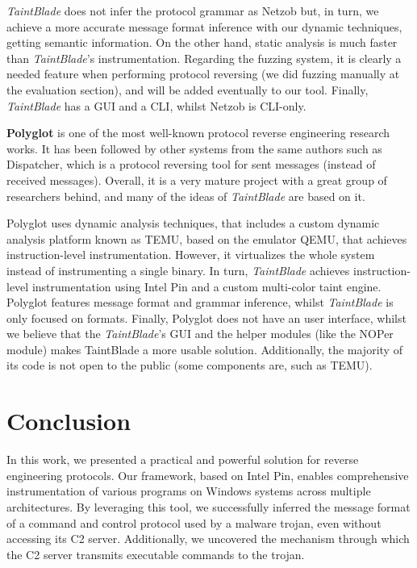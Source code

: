\documentclass[conference]{IEEEtran}
\begin{document}
\textit{TaintBlade} does not infer the protocol grammar as Netzob but, in turn, we achieve a more accurate message 
format inference with our dynamic techniques, getting semantic information. On the other hand, static analysis is
much faster than \textit{TaintBlade}'s instrumentation. Regarding the fuzzing system, it is clearly a needed feature
when performing protocol reversing (we did fuzzing manually at the evaluation section), and will be added eventually 
to our tool. Finally, \textit{TaintBlade} has a GUI and a CLI, whilst Netzob is CLI-only.

\textbf{Polyglot} \cite{polyglot_caballero} is one of the most well-known protocol reverse engineering research works. 
It has been followed by other systems from the same authors such as Dispatcher\cite{dispatcher_paper}, which is a 
protocol reversing tool for sent messages (instead of received messages). Overall, it is a very mature project with 
a great group of researchers behind, and many of the ideas of \textit{TaintBlade} are based on it.

Polyglot uses dynamic analysis techniques, that includes a custom dynamic analysis platform known as TEMU, based on the 
emulator QEMU\cite{qemu}, that achieves instruction-level instrumentation. 
However, it virtualizes the whole system instead of instrumenting a single binary. In turn, \textit{TaintBlade}
achieves instruction-level instrumentation using Intel Pin and a custom multi-color taint engine.
Polyglot features message format and grammar inference, whilst \textit{TaintBlade} is only focused on formats.
Finally, Polyglot does not have an user interface, whilst we believe that the \textit{TaintBlade}'s GUI and the 
helper modules (like the NOPer module) makes TaintBlade a more usable solution. Additionally, the majority of 
its code is not open to the public (some components are, such as TEMU).

\section{Conclusion}
In this work, we presented a practical and powerful solution for reverse engineering protocols. Our framework, based on Intel Pin,  
enables comprehensive instrumentation of various programs on Windows systems across multiple architectures. By leveraging this tool, 
we successfully inferred the message format of a command and control protocol used by a malware trojan, even without accessing its C2 server.
Additionally, we uncovered the mechanism through which the C2 server transmits executable commands to the trojan.
\end{document}
